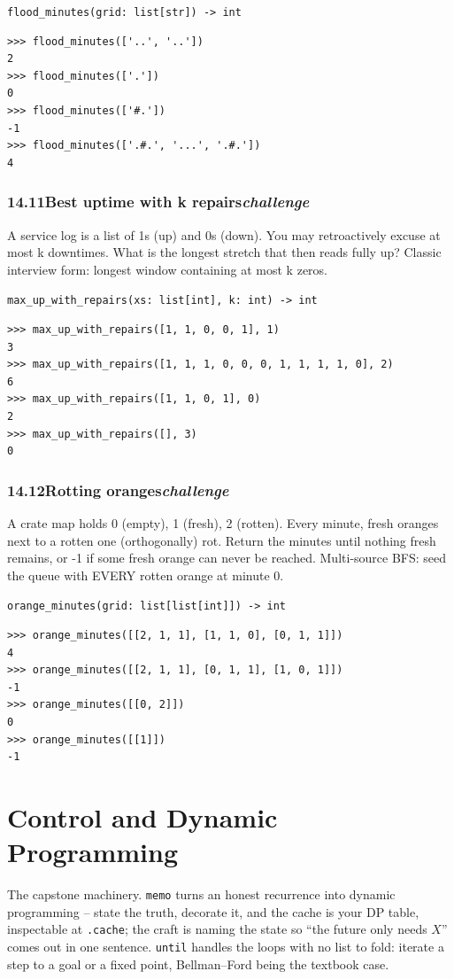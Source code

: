 \documentclass[10pt,letterpaper]{book}
\begin{document}
\noindent\texttt{flood\_minutes(grid: list[str]) -> int}
\begin{lstlisting}[style=ex]
>>> flood_minutes(['..', '..'])
2
>>> flood_minutes(['.'])
0
>>> flood_minutes(['#.'])
-1
>>> flood_minutes(['.#.', '...', '.#.'])
4
\end{lstlisting}
\subsection*{14.11\quad Best uptime with k repairs\hfill\textnormal{\textit{challenge}}}
A service log is a list of 1s (up) and 0s (down). You may retroactively excuse at most k downtimes. What is the longest stretch that then reads fully up? Classic interview form: longest window containing at most k zeros.

\noindent\texttt{max\_up\_with\_repairs(xs: list[int], k: int) -> int}
\begin{lstlisting}[style=ex]
>>> max_up_with_repairs([1, 1, 0, 0, 1], 1)
3
>>> max_up_with_repairs([1, 1, 1, 0, 0, 0, 1, 1, 1, 1, 0], 2)
6
>>> max_up_with_repairs([1, 1, 0, 1], 0)
2
>>> max_up_with_repairs([], 3)
0
\end{lstlisting}
\subsection*{14.12\quad Rotting oranges\hfill\textnormal{\textit{challenge}}}
A crate map holds 0 (empty), 1 (fresh), 2 (rotten). Every minute, fresh oranges next to a rotten one (orthogonally) rot. Return the minutes until nothing fresh remains, or -1 if some fresh orange can never be reached. Multi-source BFS: seed the queue with EVERY rotten orange at minute 0.

\noindent\texttt{orange\_minutes(grid: list[list[int]]) -> int}
\begin{lstlisting}[style=ex]
>>> orange_minutes([[2, 1, 1], [1, 1, 0], [0, 1, 1]])
4
>>> orange_minutes([[2, 1, 1], [0, 1, 1], [1, 0, 1]])
-1
>>> orange_minutes([[0, 2]])
0
>>> orange_minutes([[1]])
-1
\end{lstlisting}
\clearpage
\chapter{Control and Dynamic Programming}

The capstone machinery. \texttt{memo} turns an honest recurrence into
dynamic programming -- state the truth, decorate it, and the cache is your
DP table, inspectable at \texttt{.cache}; the craft is naming the state so
``the future only needs $X$'' comes out in one sentence. \texttt{until}
handles the loops with no list to fold: iterate a step to a goal or a fixed
point, Bellman--Ford being the textbook case.
\end{document}
